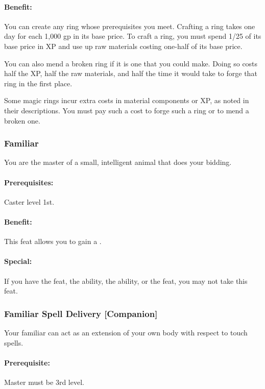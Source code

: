 \paragraph{Benefit:}
You can create any ring whose prerequisites you meet. 
Crafting a ring takes one day for each 1,000 gp in its base price. 
To craft a ring, you must spend 1/25 of its base price in XP and use up raw materials costing one-half of its base price.
 
You can also mend a broken ring if it is one that you could make. 
Doing so costs half the XP, half the raw materials, and half the time it would take to forge that ring in the first place.

Some magic rings incur extra costs in material components or XP, as noted in their descriptions. 
You must pay such a cost to forge such a ring or to mend a broken one.

\subsubsection{Familiar}
\label{Feat:Familiar}
You are the master of a small, intelligent animal that does your bidding.

\paragraph{Prerequisites:} Caster level 1st.

\paragraph{Benefit:} This feat allows you to gain a .

\paragraph{Special:} If you have the  feat, the  ability, the  ability, or the  feat, you may not take this feat.

\subsubsection[Familiar Spell Delivery]{Familiar Spell Delivery [Companion]}
\label{Feat:FamiliarSpellDelivery}
Your familiar can act as an extension of your own body with respect to touch spells.

\paragraph{Prerequisite:} Master must be 3rd level.

